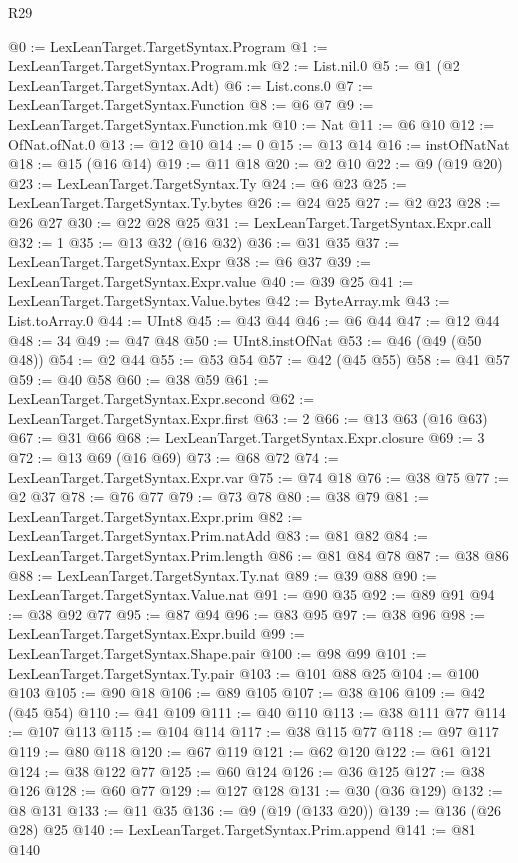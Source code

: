 \begin{lexlean}{R29}
\begin{coremodule}
@0 := LexLeanTarget.TargetSyntax.Program
@1 := LexLeanTarget.TargetSyntax.Program.mk
@2 := List.nil.{0}
@5 := @1 (@2 LexLeanTarget.TargetSyntax.Adt)
@6 := List.cons.{0}
@7 := LexLeanTarget.TargetSyntax.Function
@8 := @6 @7
@9 := LexLeanTarget.TargetSyntax.Function.mk
@10 := Nat
@11 := @6 @10
@12 := OfNat.ofNat.{0}
@13 := @12 @10
@14 := 0
@15 := @13 @14
@16 := instOfNatNat
@18 := @15 (@16 @14)
@19 := @11 @18
@20 := @2 @10
@22 := @9 (@19 @20)
@23 := LexLeanTarget.TargetSyntax.Ty
@24 := @6 @23
@25 := LexLeanTarget.TargetSyntax.Ty.bytes
@26 := @24 @25
@27 := @2 @23
@28 := @26 @27
@30 := @22 @28 @25
@31 := LexLeanTarget.TargetSyntax.Expr.call
@32 := 1
@35 := @13 @32 (@16 @32)
@36 := @31 @35
@37 := LexLeanTarget.TargetSyntax.Expr
@38 := @6 @37
@39 := LexLeanTarget.TargetSyntax.Expr.value
@40 := @39 @25
@41 := LexLeanTarget.TargetSyntax.Value.bytes
@42 := ByteArray.mk
@43 := List.toArray.{0}
@44 := UInt8
@45 := @43 @44
@46 := @6 @44
@47 := @12 @44
@48 := 34
@49 := @47 @48
@50 := UInt8.instOfNat
@53 := @46 (@49 (@50 @48))
@54 := @2 @44
@55 := @53 @54
@57 := @42 (@45 @55)
@58 := @41 @57
@59 := @40 @58
@60 := @38 @59
@61 := LexLeanTarget.TargetSyntax.Expr.second
@62 := LexLeanTarget.TargetSyntax.Expr.first
@63 := 2
@66 := @13 @63 (@16 @63)
@67 := @31 @66
@68 := LexLeanTarget.TargetSyntax.Expr.closure
@69 := 3
@72 := @13 @69 (@16 @69)
@73 := @68 @72
@74 := LexLeanTarget.TargetSyntax.Expr.var
@75 := @74 @18
@76 := @38 @75
@77 := @2 @37
@78 := @76 @77
@79 := @73 @78
@80 := @38 @79
@81 := LexLeanTarget.TargetSyntax.Expr.prim
@82 := LexLeanTarget.TargetSyntax.Prim.natAdd
@83 := @81 @82
@84 := LexLeanTarget.TargetSyntax.Prim.length
@86 := @81 @84 @78
@87 := @38 @86
@88 := LexLeanTarget.TargetSyntax.Ty.nat
@89 := @39 @88
@90 := LexLeanTarget.TargetSyntax.Value.nat
@91 := @90 @35
@92 := @89 @91
@94 := @38 @92 @77
@95 := @87 @94
@96 := @83 @95
@97 := @38 @96
@98 := LexLeanTarget.TargetSyntax.Expr.build
@99 := LexLeanTarget.TargetSyntax.Shape.pair
@100 := @98 @99
@101 := LexLeanTarget.TargetSyntax.Ty.pair
@103 := @101 @88 @25
@104 := @100 @103
@105 := @90 @18
@106 := @89 @105
@107 := @38 @106
@109 := @42 (@45 @54)
@110 := @41 @109
@111 := @40 @110
@113 := @38 @111 @77
@114 := @107 @113
@115 := @104 @114
@117 := @38 @115 @77
@118 := @97 @117
@119 := @80 @118
@120 := @67 @119
@121 := @62 @120
@122 := @61 @121
@124 := @38 @122 @77
@125 := @60 @124
@126 := @36 @125
@127 := @38 @126
@128 := @60 @77
@129 := @127 @128
@131 := @30 (@36 @129)
@132 := @8 @131
@133 := @11 @35
@136 := @9 (@19 (@133 @20))
@139 := @136 (@26 @28) @25
@140 := LexLeanTarget.TargetSyntax.Prim.append
@141 := @81 @140

\end{coremodule}
\end{lexlean}
